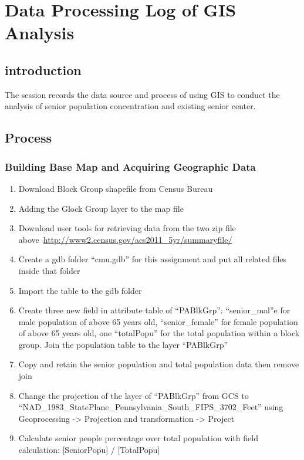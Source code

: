 
\chapter{Data Processing Log of GIS Analysis} %

\label{AppendixB} %

\section{introduction}
The session records the data source and process of using GIS to
conduct the analysis of senior population concentration and existing
senior center.
\section{Process}
\subsection{Building Base Map and Acquiring Geographic Data}
\begin{enumerate}
\item Download Block Group shapefile from Census Bureau
\item Adding the Glock Group layer to the map file
\item Download user tools for retrieving data from the two zip file above~\url{http://www2.census.gov/acs2011_5yr/summaryfile/}
\item Create a gdb folder ``cmu.gdb'' for this assignment and put all related files inside that folder
\item Import the table to the gdb folder
\item Create three new field in attribute table of ``PABlkGrp'':
``senior\_mal''e for male population of above 65 years old,
``senior\_female'' for female population of above 65 years old, one
``totalPopu'' for the total population within a block group.
Join the population table to the layer ``PABlkGrp''
\item Copy and retain the senior population and total population data then remove join
\item Change the projection of the layer of ``PABlkGrp'' from GCS to ``NAD\_1983\_StatePlane\_Pennsylvania\_South\_FIPS\_3702\_Feet'' using Geoprocessing -> Projection and transformation -> Project
\item Calculate senior people percentage over total population with field calculation: [SeniorPopu] / [TotalPopu]
\end{enumerate}

